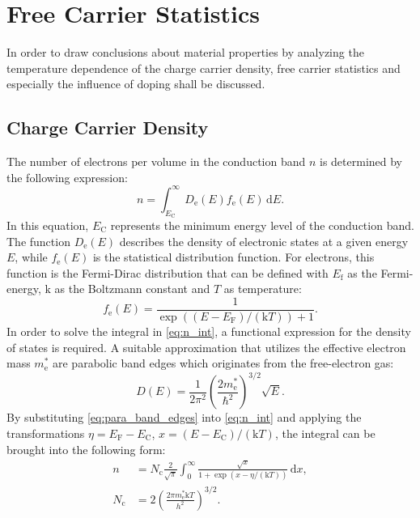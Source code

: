 \section{Free Carrier Statistics}
In order to draw conclusions about material properties by analyzing
the temperature dependence of the charge carrier density,
free carrier statistics and especially the influence of doping shall be
discussed.
\subsection{Charge Carrier Density}
The number of electrons per volume in the conduction band $n$ is
determined by the following expression:
\begin{equation}
	n=\int _{E_{\mathrm{C}}}^{\infty} D_{\mathrm{e}}(E)
	f_{\mathrm{e}}(E)\, \mathrm{d}E.
	\label{eq:n_int}
\end{equation}
In this equation, $E_{\mathrm{C}}$ represents the minimum energy level of
the conduction band. The function $D_{\mathrm{e}}(E)$ describes
the density of electronic states at a given energy $E$, while
$f_{\mathrm{e}}(E)$ is the statistical distribution function.
For electrons, this function is the Fermi-Dirac distribution that can be
defined with $E_\mathrm{f}$ as the Fermi-energy, $\mathrm{k}$ as the
Boltzmann constant and $T$ as temperature:
\begin{equation}
	f_{\mathrm{e}}(E)
	=\frac{1}{\exp((E-E_{\mathrm{F}})/(\mathrm{k}T))+1}.
\end{equation}
In order to solve the integral in \cref{eq:n_int}, a functional
expression for the density of states is required.
A suitable approximation that utilizes the effective electron mass
$m^*_\mathrm{e}$ are
parabolic band edges which originates from the free-electron gas:
\begin{equation}
	D(E)=\frac{1}{2\pi^2}
	\left( \frac{2m^*_\mathrm{e}}{\hbar^2} \right)^{3 / 2} \sqrt{E}.
	\label{eq:para_band_edges}
\end{equation}
By substituting \cref{eq:para_band_edges} into \cref{eq:n_int} and applying
the transformations $\eta=E_\mathrm{F}-E_\mathrm{C}$,
$x = (E-E_\mathrm{C}) / (\mathrm{k} T)$, the integral can be brought into
the following form:
\begin{align}
	n            & = N_\mathrm{c} \frac{2}{\sqrt{\pi}}
	\int_{0}^{\infty} \frac{\sqrt{ x }}{1+\exp(x-\eta / (\mathrm{k}T))} \,
	\mathrm{d}x \label{eq:n_int_2},                                        \\
	N_\mathrm{c} & = 2 \left( \frac{2 \pi m^*_\mathrm{e} \mathrm{k}T}{h^2}
	\right)^{3 / 2}.
\end{align}
